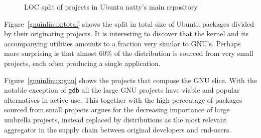 \documentclass[11pt]{article}
\begin{document}
\begin{figure}[htb]
  \begin{center}
  \end{center}
  \caption{LOC split of projects in Ubuntu natty's main repository}
  \label{fig:gnuinlinux}
\end{figure}

Figure~\ref{gnuinlinux:total} shows the split in total size of Ubuntu packages divided by their originating projects. It is interesting to discover that the kernel and its accompanying utilities amounts to a fraction very similar to GNU's. Perhaps more surprising is that almost 60\% of the distribution is sourced from very small projects, each often producing a single application.

Figure~\ref{gnuinlinux:gnu} shows the projects that compose the GNU slice. With the notable exception of \texttt{gdb} all the large GNU projects have viable and popular alternatives in active use. This together with the high percentage of packages sourced from small projects argues for the decreasing importance of large umbrella projects, instead replaced by distributions as the most relevant aggregator in the supply chain between original developers and end-users.
\end{document}
